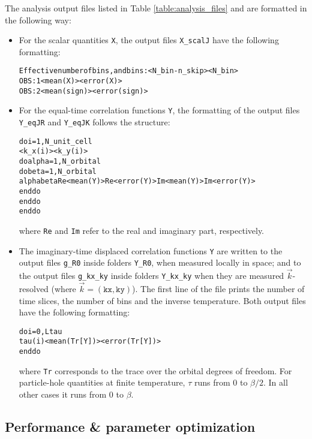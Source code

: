 %
The analysis output files listed in Table \ref{table:analysis_files} and are formatted in the following way:
\begin{itemize}
	\item For the scalar quantities \texttt{X}, the output files  \texttt{X\_scalJ} have the following formatting:
	\begin{alltt}
		Effective number of bins, and bins:           <N_bin - n_skip>          <N_bin>	
		OBS :    1      <mean(X)>      <error(X)>	
		OBS :    2      <mean(sign)>   <error(sign)>
	\end{alltt}
	
	\item For the equal-time correlation functions \texttt{Y}, the formatting of the output files \texttt{Y\_eqJR} and \texttt{Y\_eqJK} follows the structure:
	\begin{alltt}
		do i = 1, N_unit_cell
		   <k_x(i)>   <k_y(i)>
		   do alpha = 1, N_orbital
		      do beta  = 1, N_orbital
		         alpha   beta   Re<mean(Y)>   Re<error(Y)>   Im<mean(Y)>   Im<error(Y)>
		      enddo
		   enddo
		enddo
	\end{alltt}
	where \texttt{Re} and \texttt{Im} refer to the real and imaginary part, respectively.
	
	\item The imaginary-time displaced correlation functions \texttt{Y} are written to the output files \texttt{g\_R0} inside folders \texttt{Y\_R0}, when measured locally in space; 
	and to the output files \texttt{g\_kx\_ky} inside folders \texttt{Y\_kx\_ky} when they are measured $\vec{k}$-resolved (where $\vec{k}=(\texttt{kx}, \texttt{ky})$). The first line of the file prints the number of time slices, 
	the number of bins and the inverse temperature. 
	Both output files have the following formatting:
	\begin{alltt}
		do i = 0, Ltau
		   tau(i)   <mean( Tr[Y] )>   <error( Tr[Y])>
		enddo
	\end{alltt}
	where \texttt{Tr} corresponds to the trace over the orbital degrees of freedom.   For particle-hole quantities at finite temperature,  $\tau$ runs from 
	$0$ to $\beta/2$.   In all other cases it runs from $0$ to $\beta$. 
	
	
\end{itemize}



%
\subsection{Performance \& parameter optimization} \label{sec:optimize}
%


